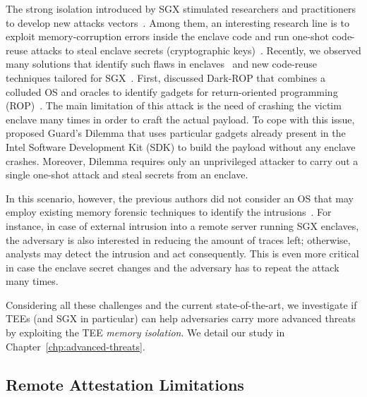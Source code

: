 The strong isolation introduced by SGX stimulated researchers and practitioners 
to develop new attacks 
vectors~\citep{foreshadow,Murdock2019plundervolt,203183,lee2017hacking}.
Among them, an interesting research line is to exploit memory-corruption 
errors inside the enclave code and run one-shot code-reuse attacks to steal 
enclave secrets (\eg cryptographic keys)~\citep{geometry2007}.
Recently, we observed many solutions that identify such flaws in 
enclaves~\citep{teerex,tale-two-worlds} and new code-reuse techniques 
tailored for SGX~\citep{lee2017hacking,biondo2018guard}.
First, \cite{lee2017hacking} discussed Dark-ROP that combines a colluded OS and 
oracles to identify gadgets for return-oriented programming 
(ROP)~\citep{geometry2007}.
The main limitation of this attack is the need of crashing the victim
enclave many times in order to craft the actual payload.
To cope with this issue, \cite{biondo2018guard} proposed Guard's 
Dilemma that uses particular gadgets already present in the Intel Software 
Development Kit (SDK) to build the payload without any enclave crashes.
Moreover, Dilemma requires only an unprivileged attacker to carry out a 
single one-shot attack and steal secrets from an enclave.


In this scenario, however, the previous authors did not consider an OS that may 
employ existing memory forensic techniques to identify the 
intrusions~\citep{stancill2013check,polychronakis2011rop,kittel2015counteracting,Graziano:2016:RFA:2897845.2897894}.
For instance, in case of external intrusion into a remote server running SGX 
enclaves, the adversary is also interested in reducing the amount of traces 
left; otherwise, analysts may detect the intrusion and act consequently.
This is even more critical in case the enclave secret changes and the adversary 
has to repeat the attack many times.

Considering all these challenges and the current state-of-the-art, we 
investigate if TEEs (and SGX in particular) can help adversaries carry more 
advanced threats by exploiting the TEE \emph{memory isolation}.
We detail our study in Chapter~\ref{chp:advanced-threats}.

\subsection{Remote Attestation Limitations}
\label{ssec:contribution3}

